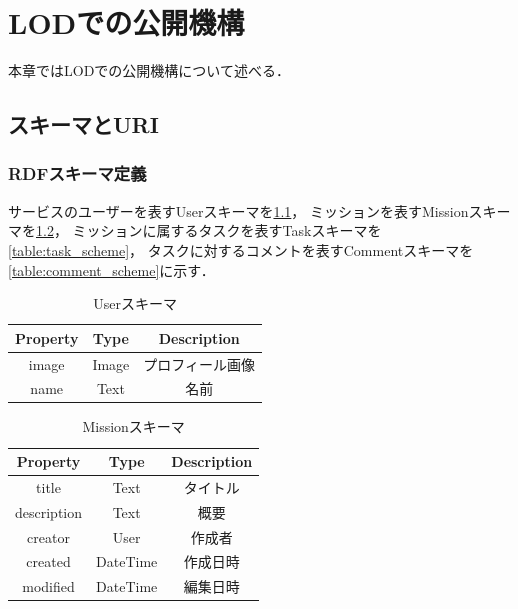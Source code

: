 \chapter{LODでの公開機構}
本章ではLODでの公開機構について述べる．

\section{スキーマとURI}

\subsection{RDFスキーマ定義}
サービスのユーザーを表すUserスキーマを\ref{table:user_scheme}，
ミッションを表すMissionスキーマを\ref{table:mission_scheme}，
ミッションに属するタスクを表すTaskスキーマを\ref{table:task_scheme}，
タスクに対するコメントを表すCommentスキーマを\ref{table:comment_scheme}に示す．

\begin{table}[t]
 \caption{Userスキーマ}
 \begin{center}
	 \begin{tabular}{ | c | c | c | } \hline
	    Property & Type & Description \\ \hline \hline
			image & Image & プロフィール画像 \\ \hline
			name & Text & 名前 \\ \hline
	 \end{tabular}
	 \label{table:user_scheme}
 \end{center}
\end{table}

\begin{table}[t]
 \caption{Missionスキーマ}
 \begin{center}
	 \begin{tabular}{ | c | c | c | } \hline
	    Property & Type & Description \\ \hline \hline
			title & Text & タイトル \\ \hline
			description & Text & 概要 \\ \hline
			creator & User & 作成者 \\ \hline
			created & DateTime & 作成日時 \\ \hline
			modified & DateTime & 編集日時 \\ \hline
	 \end{tabular}
	 \label{table:mission_scheme}
 \end{center}
\end{table}

